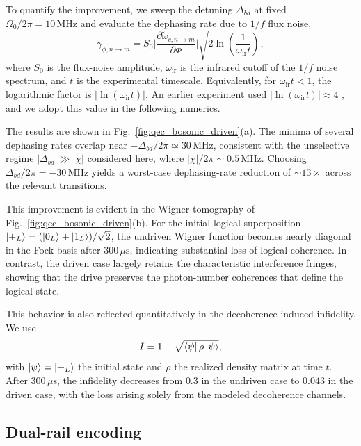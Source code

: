 To quantify the improvement, we sweep the detuning \(\Delta_{bd}\) at fixed \(\Omega_0/2\pi = 10\,\mathrm{MHz}\) and evaluate the dephasing rate due to \(1/f\) flux noise,
\begin{equation}
\gamma_{\phi,n\rightarrow m}
=
S_0
\bigg|
\frac{\partial \widetilde{\omega}_{c,n\rightarrow m}}{\partial \Phi}
\bigg|
\sqrt{
2\ln\!\left(\frac{1}{\omega_{\mathrm{ir}}t}\right)
},
\label{eq:qec_dephasing_rate}
\end{equation}
where \(S_0\) is the flux-noise amplitude, \(\omega_{\mathrm{ir}}\) is the infrared cutoff of the \(1/f\) noise spectrum, and \(t\) is the experimental timescale. Equivalently, for \(\omega_{\mathrm{ir}}t<1\), the logarithmic factor is \( |\ln(\omega_{\mathrm{ir}}t)| \). An earlier experiment used \( |\ln(\omega_{\mathrm{ir}}t)|\approx 4 \) \cite{PhysRevX.7.031037factor4}, and we adopt this value in the following numerics.

The results are shown in Fig.~\ref{fig:qec_bosonic_driven}(a). The minima of several dephasing rates overlap near \(-\Delta_{bd}/2\pi \simeq 30\,\mathrm{MHz}\), consistent with the unselective regime \(|\Delta_{bd}|\gg |\chi|\) considered here, where \(|\chi|/2\pi \sim 0.5\,\mathrm{MHz}\). Choosing \(\Delta_{bd}/2\pi = -30\,\mathrm{MHz}\) yields a worst-case dephasing-rate reduction of \(\sim 13\times\) across the relevant transitions.

This improvement is evident in the Wigner tomography of Fig.~\ref{fig:qec_bosonic_driven}(b). For the initial logical superposition \(\ket{+_L} = (\ket{0_L}+\ket{1_L})/\sqrt{2}\), the undriven Wigner function becomes nearly diagonal in the Fock basis after \(300\,\mu\mathrm{s}\), indicating substantial loss of logical coherence. In contrast, the driven case largely retains the characteristic interference fringes, showing that the drive preserves the photon-number coherences that define the logical state.

This behavior is also reflected quantitatively in the decoherence-induced infidelity. We use
\begin{equation}
I=1-\sqrt{\bra{\psi}\rho\ket{\psi}},
\label{eq:qec_infidelity}
\end{equation}
with \(\ket{\psi}=\ket{+_L}\) the initial state and \(\rho\) the realized density matrix at time \(t\). After \(300\,\mu\mathrm{s}\), the infidelity decreases from \(0.3\) in the undriven case to \(0.043\) in the driven case, with the loss arising solely from the modeled decoherence channels.
\subsection{Dual-rail encoding}
\label{subsec:dual-rail}

